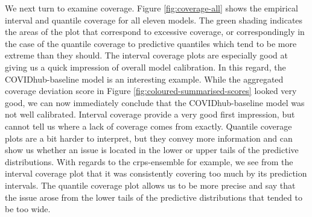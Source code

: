 \documentclass[
]{book}
\begin{document}
We next turn to examine coverage. Figure \ref{fig:coverage-all} shows the empirical interval and quantile coverage for all eleven models. The green shading indicates the areas of the plot that correspond to excessive coverage, or correspondingly in the case of the quantile coverage to predictive quantiles which tend to be more extreme than they should. The interval coverage plots are especially good at giving us a quick impression of overall model calibration. In this regard, the COVIDhub-baseline model is an interesting example. While the aggregated coverage deviation score in Figure \ref{fig:coloured-summarised-scores} looked very good, we can now immediately conclude that the COVIDhub-baseline model was not well calibrated. Interval coverage provide a very good first impression, but cannot tell us where a lack of coverage comes from exactly. Quantile coverage plots are a bit harder to interpret, but they convey more information and can show us whether an issue is located in the lower or upper tails of the predictive distributions. With regards to the crps-ensemble for example, we see from the interval coverage plot that it was consistently covering too much by its prediction intervals. The quantile coverage plot allows us to be more precise and say that the issue arose from the lower tails of the predictive distributions that tended to be too wide.
\end{document}
